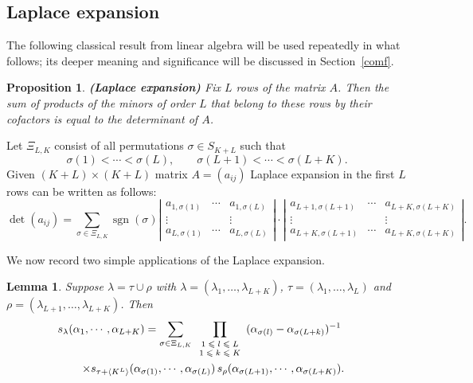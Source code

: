 \documentclass[11pt]{amsart}
\newcommand{\tmop}[1]{\ensuremath{\operatorname{#1}}}
\newtheorem{proposition}{Proposition}
\newcommand{\dueto}[1]{\textup{\textbf{(#1) }}}
\newtheorem{lemma}{Lemma}
\newcommand{\tmscript}[1]{\text{\scriptsize $#1$}}
\begin{document}
\subsection{Laplace expansion}
The following classical result from linear algebra will be used
repeatedly in what follows; its deeper meaning and significance
will be discussed in Section~\ref{comf}.

\begin{proposition}
{\dueto{Laplace expansion}} \label{prop:lexp} Fix $L$ rows of the
matrix $A$.  Then the sum of products of the minors of order $L$
that belong to these rows by their cofactors is equal to the
determinant of $A$.
\end{proposition}

Let $\Xi_{L, K}$ consist of all permutations $\sigma \in S_{K +
L}$ such that \begin{equation} \label{perms} \sigma ( 1 ) < \cdots
< \sigma ( L ), \hspace{2em} \sigma ( L + 1 ) <
  \cdots < \sigma ( L + K ) .
  \end{equation}
Given $( K + L ) \times ( K + L )$ matrix $A = ( a_{ij} )$ Laplace
expansion in the first $L$ rows can be written as follows:
\[ \det ( a_{ij} ) = \sum_{\sigma \in \Xi_{L, K}} \tmop{sgn} ( \sigma )
    \left| \begin{array}{ccc}
      a_{1, \sigma ( 1 )} & \cdots & a_{1, \sigma ( L )}\\
      \vdots &  & \vdots\\
      a_{L, \sigma ( 1 )} & \cdots & a_{L, \sigma ( L )}
    \end{array} \right| \cdot \left| \begin{array}{ccc}
      a_{L + 1, \sigma ( L + 1 )} & \cdots & a_{L + K, \sigma ( L + K )}\\
      \vdots &  & \vdots\\
      a_{L + K, \sigma ( L + 1 )} & \cdots & a_{L + K, \sigma ( L + K )}
    \end{array} \right| . \]

We now record two simple applications of the Laplace expansion.


\begin{lemma}
\label{lem:min1}Suppose $\lambda = \tau \cup \rho$ with $\lambda =
( \lambda_1, \ldots, \lambda_{L + K} )$, $\tau = ( \lambda_1,
\ldots, \lambda_L )$ and $\rho = ( \lambda_{L + 1}, \ldots,
\lambda_{L + K} )$. Then
\begin{eqnarray}
   s_{\lambda} ( \alpha_1, \cdots, \alpha_{L + K} ) = \sum_{\sigma \in
   \Xi_{L, K}} \prod_{\tmscript{\begin{array}{c}
     1 \leqslant l \leqslant L\\
     1 \leqslant k \leqslant K
   \end{array}}} ( \alpha_{\sigma ( l )} - \alpha_{\sigma ( L + k )} )^{- 1}
   &  &  \nonumber\\
   \times s_{\tau + \left\langle K^L \right\rangle} ( \alpha_{\sigma ( 1 )},
   \cdots, \alpha_{\sigma ( L )} ) \, s_{\rho} ( \alpha_{\sigma ( L + 1 )},
   \cdots, \alpha_{\sigma ( L + K )} ) & . &
\end{eqnarray}
\end{lemma}
\end{document}
